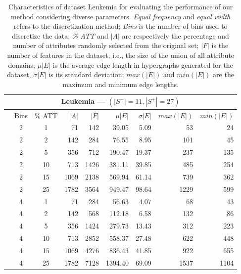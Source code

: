 \documentclass[12pt,a4paper]{article}
\begin{document}
\begin{table}
\caption
{Characteristics of dataset Leukemia for evaluating the performance of our method considering diverse parameters.
\emph{Equal frequency} and \emph{equal width} refers to the discretization method;
\emph{Bins} is the number of bins used to discretize the data; \emph{\% ATT} and $|A|$ are respectively the percentage
and number of attributes randomly selected from the original set; $|F|$ is the number of features in the dataset, i.e., the
size of the union of all attribute domains; $\mu{|E|}$ is the average edge length in hypergraphs generated for the dataset,
$\sigma{|E|}$ is its standard deviation; $max(|E|)$ and $min(|E|)$ are the maximum and minimum edge lengths.}
\label{exp:leukemia}
\begin{center}\small
\begin{tabular}{cccrrrrrr}
\hline
\multicolumn{9}{c}{\parbox{10cm}{\vspace{0.1cm}\centering \textbf{\large Leukemia} --- $(|S^{-}|=11, |S^{+}|=27)$\vspace{0.1cm}}} \\\hline
\parbox{0.1cm}{\vspace{0.5cm}}& Bins & \% ATT & $|A|$ & $|F|$ & $\mu{|E|}$ & $\sigma{|E|}$ & $max(|E|)$ & $min(|E|)$ \\\hline

&  2 & 1 &  71 & 142  & 39.05 & 5.09 &  53 &  24 \\ 
&  2 & 2 & 142 & 284  & 76.55 & 8.95 & 101 &  45 \\ 
&  2 & 5 & 356 & 712  & 190.47 & 19.37 & 237 & 135 \\
& 2 & 10 & 713 & 1426  & 381.11 & 39.85 & 485 & 254 \\ 
&  2 & 15 & 1069 & 2138  & 569.94 & 61.14 & 739 & 362 \\ 
&  2 & 25 & 1782 & 3564  & 949.47 & 98.64 & 1229 & 599 \\ 
&  4 & 1 &  71 & 284  & 56.63 & 4.07 &  68 &  43 \\ 
&  4 & 2 & 142 & 568  & 112.18 & 6.58 & 132 &  86 \\ 
&  4 & 5 & 356 & 1424  & 279.73 & 13.43 & 312 & 223 \\
&  4 & 10 & 713 & 2852  & 558.37 & 27.48 & 622 & 448 \\ 
&  4 & 15 & 1069 & 4276  & 836.43 & 41.85 & 922 & 655 \\ 
&  4 & 25 & 1782 & 7128  & 1394.40 & 69.09 & 1537 & 1104 \\ \hline


\end{tabular}
\end{center}
\end{table}
\end{document}
